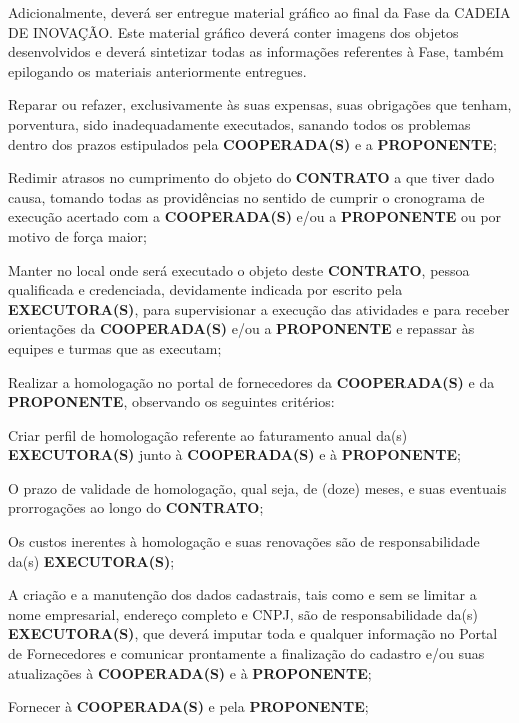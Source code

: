 \xxx Adicionalmente, deverá ser entregue material gráfico ao final da Fase da CADEIA DE INOVAÇÃO. Este material gráfico deverá conter imagens dos objetos desenvolvidos e deverá sintetizar todas as informações referentes à Fase, também epilogando os materiais anteriormente entregues.

\xx Reparar ou refazer, exclusivamente às suas expensas, suas obrigações que tenham, porventura, sido inadequadamente executados, sanando todos os problemas dentro dos prazos estipulados pela \textbf{COOPERADA(S)} e a \textbf{PROPONENTE};

\xx Redimir atrasos no cumprimento do objeto do \textbf{CONTRATO} a que tiver dado causa, tomando todas as providências no sentido de cumprir o cronograma de execução acertado com a \textbf{COOPERADA(S)} e/ou a \textbf{PROPONENTE} ou por motivo de força maior;

\xx Manter no local onde será executado o objeto deste \textbf{CONTRATO}, pessoa qualificada e credenciada, devidamente indicada por escrito pela \textbf{EXECUTORA(S)}, para supervisionar a execução das atividades e para receber orientações da \textbf{COOPERADA(S)} e/ou a \textbf{PROPONENTE} e repassar às equipes e turmas que as executam;

\xx Realizar a homologação no portal de fornecedores da \textbf{COOPERADA(S)} e da \textbf{PROPONENTE}, observando os seguintes critérios:

\xxx  Criar perfil de homologação referente ao faturamento anual da(s) \textbf{EXECUTORA(S)} junto à \textbf{COOPERADA(S)} e à \textbf{PROPONENTE};

\xxx  O prazo de validade de homologação, qual seja, de (doze) meses, e suas eventuais prorrogações ao longo do \textbf{CONTRATO};

\xxx  Os custos inerentes à homologação e suas renovações são de responsabilidade da(s) \textbf{EXECUTORA(S)};

\xxx  A criação e a manutenção dos dados cadastrais, tais como e sem se limitar a nome empresarial, endereço completo e CNPJ, são de responsabilidade da(s) \textbf{EXECUTORA(S)}, que deverá imputar toda e qualquer informação no Portal de Fornecedores e comunicar prontamente a finalização do cadastro e/ou suas atualizações à \textbf{COOPERADA(S)} e à \textbf{PROPONENTE};

\xx Fornecer à \textbf{COOPERADA(S)} e pela \textbf{PROPONENTE};

